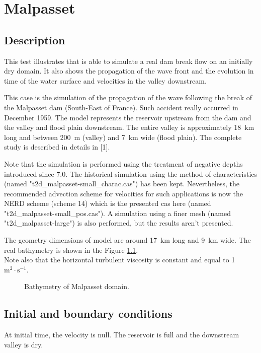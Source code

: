 \chapter{Malpasset}
%
%
\section{Description}
\bigskip
This test illustrates that  is able to simulate a real 
dam break flow on an initially dry domain.
It also shows the propagation of the wave front and the evolution 
in time of the water surface and velocities in the valley downstream.

\bigskip
This case is the simulation of the propagation of the wave following 
the break of the Malpasset dam (South-East of France). Such accident really 
occurred in December 1959. The model represents the reservoir upstream 
from the dam and the valley and flood plain downstream. The entire valley 
is approximately 18~km long and between 200~m (valley) and 7~km wide (flood plain).
The complete study is described in details in [1].

\bigskip
Note that the simulation is performed using the treatment of negative depths 
introduced since  7.0. The historical simulation using the method 
of characteristics (named \sloppy "t2d\_malpasset-small\_charac.cas") has been kept. 
Nevertheless, the recommended advection scheme for velocities for such applications 
is now the NERD scheme (scheme 14) which is the presented cas here
(named "t2d\_malpasset-small\_pos.cas"). 
A simulation using a finer mesh (named "t2d\_malpasset-large") is also performed, 
but the results aren't presented. 

\bigskip
The geometry dimensions of model are around 17~km long and 9~km wide. 
The real bathymetry is shown in the Figure \ref{t2d:malpasset:fig:bathy}.\\
Note also that the horizontal turbulent viscosity is constant 
and equal to 1~$\text{m}^2\cdot\text{s}^{-1}$.
%
\begin{figure}[!htbp]
 \centering
 \caption{Bathymetry of Malpasset domain.}
 \label{t2d:malpasset:fig:bathy}
\end{figure}
%
\section{Initial and boundary conditions}
\bigskip
At initial time, the velocity is null. The reservoir is 
full and  the downstream valley is dry.

